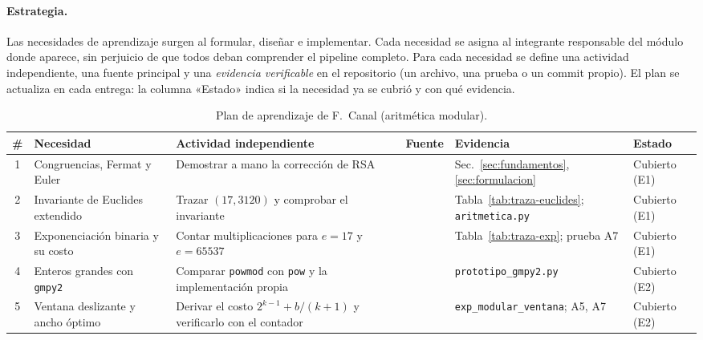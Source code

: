 \paragraph{Estrategia.} Las necesidades de aprendizaje surgen al formular,
diseñar e implementar. Cada necesidad se asigna al integrante responsable del
módulo donde aparece, sin perjuicio de que todos deban comprender el pipeline
completo. Para cada necesidad se define una actividad independiente, una fuente
principal y una \emph{evidencia verificable} en el repositorio (un archivo, una
prueba o un commit propio). El plan se actualiza en cada entrega: la columna
«Estado» indica si la necesidad ya se cubrió y con qué evidencia.

\newcommand{\planhead}{%
\toprule
\textbf{\#} & \textbf{Necesidad} & \textbf{Actividad independiente} & \textbf{Fuente} & \textbf{Evidencia} & \textbf{Estado}\\
\midrule}

\begin{table}[H]
\centering\footnotesize
\caption{Plan de aprendizaje de F.~Canal (aritmética modular).}
\begin{tabularx}{\textwidth}{@{}c N Y F V S@{}}
\planhead
1 & Congruencias, Fermat y Euler & Demostrar a mano la corrección de RSA & \cite{clrs} & Sec.~\ref{sec:fundamentos}, \ref{sec:formulacion} & Cubierto (E1)\\
2 & Invariante de Euclides extendido & Trazar $(17, 3120)$ y comprobar el invariante & \cite{knuth} & Tabla~\ref{tab:traza-euclides}; \texttt{aritmetica.py} & Cubierto (E1)\\
3 & Exponenciación binaria y su costo & Contar multiplicaciones para $e=17$ y $e=65537$ & \cite{knuth} & Tabla~\ref{tab:traza-exp}; prueba A7 & Cubierto (E1)\\
4 & Enteros grandes con \texttt{gmpy2} & Comparar \texttt{powmod} con \texttt{pow} y la implementación propia & \cite{gmpy2} & \texttt{prototipo\_\allowbreak gmpy2.py} & Cubierto (E2)\\
5 & Ventana deslizante y ancho óptimo & Derivar el costo $2^{k-1} + b/(k+1)$ y verificarlo con el contador & \cite{knuth,hac} & \texttt{exp\_modular\_\allowbreak ventana}; A5, A7 & Cubierto (E2)\\
\bottomrule
\end{tabularx}
\end{table}

